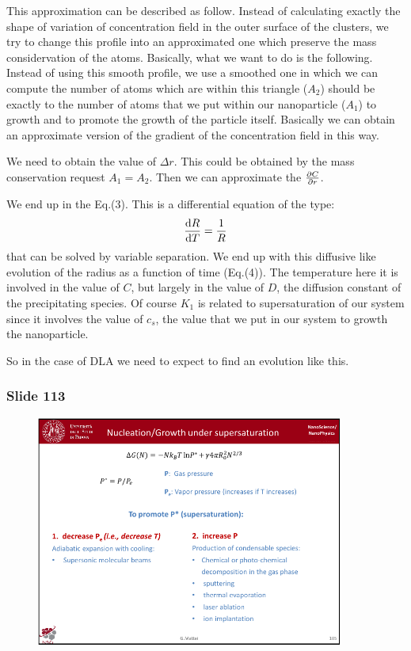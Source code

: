 \documentclass[../main/main.tex]{subfiles}
\begin{document}
This approximation can be described as follow. Instead of calculating exactly the shape of variation of concentration field in the outer surface of the clusters, we try to change this profile into an approximated one which preserve the mass considervation of the atoms. Basically, what we want to do is the following. Instead of using this smooth profile, we use a smoothed one in which we can compute the number of atoms which are within this triangle (\( A_2 \)) should be exactly to the number of atoms that we put within  our nanoparticle (\( A_1 \)) to growth and to promote the growth of the particle itself. Basically we can obtain an approximate version of the gradient of the concentration field in this way.

We need to obtain the value of \( \Delta r \). This could be obtained by the mass conservation request \( A_1=A_2 \). Then we can approximate the \( \pdv{C}{r}  \).

We end up in the Eq.(3). This is a differential equation of the type:
\begin{equation*}
  \dv{R}{T} = \frac{1}{R}
\end{equation*}
that can be solved by variable separation.
We end up with this diffusive like evolution of the radius as a function of time (Eq.(4)). The temperature here it  is involved in the value of \( C \), but largely in the value of \( D \), the diffusion constant of the precipitating species.
Of course \( K_1 \) is related to supersaturation of our system since it involves the value of \( c_s \), the value that we put in our system to growth the nanoparticle.

So in the case of DLA we need to expect to find an evolution like this.

\newpage

\subsubsection{Slide 113}

\begin{figure}[h!]
\centering
\includegraphics[page=9,width=0.9\textwidth]{../lessons/pdf_file/7_lesson.pdf}
\end{figure}
\end{document}
